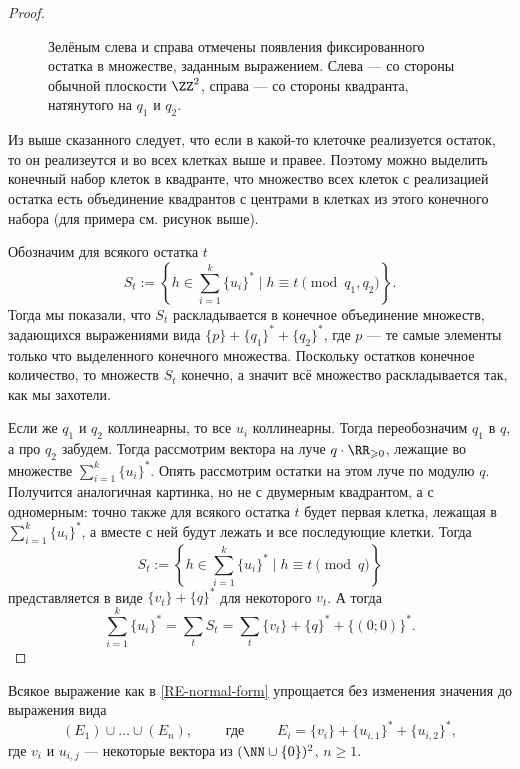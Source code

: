 \documentclass[12pt,a4paper]{article}
\begin{document}
\begin{problem}{8}
\begin{enumerate}
\begin{proof}
\begin{figure}[H]
                        \caption{Зелёным слева и справа отмечены появления фиксированного остатка в множестве, заданным выражением. Слева --- со стороны обычной плоскости $\ZZ^2$, справа --- со стороны квадранта, натянутого на $q_1$ и $q_2$.}
                    \end{figure}
                    Из выше сказанного следует, что если в какой-то клеточке реализуется остаток, то он реализеутся и во всех клетках выше и правее. Поэтому можно выделить конечный набор клеток в квадранте, что множество всех клеток с реализацией остатка есть объединение квадрантов с центрами в клетках из этого конечного набора (для примера см. рисунок выше).

                    Обозначим для всякого остатка $t$
                    \[S_t := \left\{h \in \sum_{i=1}^k \{u_i\}^* \mid h \equiv t \pmod{q_1, q_2}\right\}.\]
                    Тогда мы показали, что $S_t$ раскладывается в конечное объединение множеств, задающихся выражениями вида $\{p\} + \{q_1\}^* + \{q_2\}^*$, где $p$ --- те самые элементы только что выделенного конечного множества. Поскольку остатков конечное количество, то множеств $S_t$ конечно, а значит всё множество раскладывается так, как мы захотели.

                    Если же $q_1$ и $q_2$ коллинеарны, то все $u_i$ коллинеарны. Тогда переобозначим $q_1$ в $q$, а про $q_2$ забудем. Тогда рассмотрим вектора на луче $q \cdot \RR_{\geqslant 0}$, лежащие во множестве $\sum_{i=1}^k \{u_i\}^*$. Опять рассмотрим остатки на этом луче по модулю $q$. Получится аналогичная картинка, но не с двумерным квадрантом, а с одномерным: точно также для всякого остатка $t$ будет первая клетка, лежащая в $\sum_{i=1}^k \{u_i\}^*$, а вместе с ней будут лежать и все последующие клетки. Тогда
                    \[S_t := \left\{h \in \sum_{i=1}^k \{u_i\}^* \mid h \equiv t \pmod{q}\right\}\]
                    представляется в виде $\{v_t\} + \{q\}^*$ для некоторого $v_t$. А тогда
                    \[\sum_{i=1}^k \{u_i\}^* = \sum_{t} S_t = \sum_t \{v_t\} + \{q\}^* + \{(0; 0)\}^*.\]
                \end{proof}

                \begin{corollary}\label{RE-2-normal-form}
                    Всякое выражение как в \ref{RE-normal-form} упрощается без изменения значения до выражения вида
                    \[
                        (E_1) \cup \dots \cup (E_n),
                        \qquad \text{ где } \qquad
                        E_i = \{v_i\} + \{u_{i, 1}\}^* + \{u_{i, 2}\}^*,
                    \]
                    где $v_i$ и $u_{i, j}$ --- некоторые вектора из $(\NN \cup \{0\})^2$, $n \geqslant 1$.
                \end{corollary}


\end{enumerate}
\end{problem}
\end{document}
